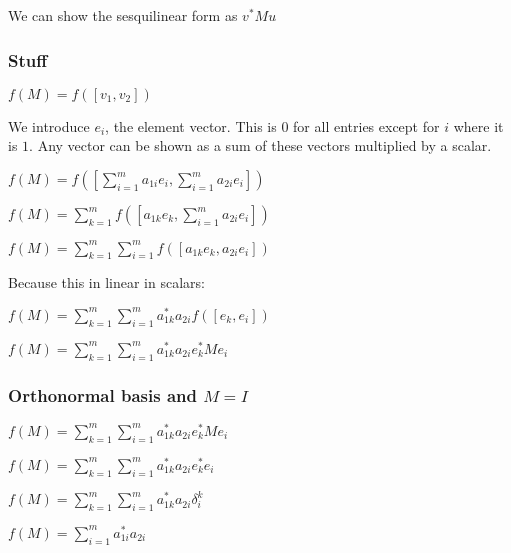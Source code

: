 We can show the sesquilinear form as \(v^*Mu\)

\subsubsection{Stuff}

\(f(M)=f([v_1,v_2])\)

We introduce \(e_i\), the element vector. This is \(0\) for all entries except for \(i\) where it is \(1\). Any vector can be shown as a sum of these vectors multiplied by a scalar.

\(f(M)=f([\sum^m_{i=1}a_{1i}e_i,\sum^m_{i=1}a_{2i}e_i])\)

\(f(M)=\sum_{k=1}^mf([a_{1k}e_k,\sum^m_{i=1}a_{2i}e_i])\)

\(f(M)=\sum_{k=1}^m\sum^m_{i=1}f([a_{1k}e_k,a_{2i}e_i])\)

Because this in linear in scalars:

\(f(M)=\sum_{k=1}^m\sum^m_{i=1}a_{1k}^*a_{2i}f([e_k,e_i])\)

\(f(M)=\sum_{k=1}^m\sum^m_{i=1}a_{1k}^*a_{2i}e_k^*Me_i\)

\subsubsection{Orthonormal basis and \(M=I\)}

\(f(M)=\sum_{k=1}^m\sum^m_{i=1}a_{1k}^*a_{2i}e_k^*Me_i\)

\(f(M)=\sum_{k=1}^m\sum^m_{i=1}a_{1k}^*a_{2i}e_k^*e_i\)

\(f(M)=\sum_{k=1}^m\sum^m_{i=1}a_{1k}^*a_{2i}\delta_i^k\)

\(f(M)=\sum^m_{i=1}a_{1i}^*a_{2i}\)

